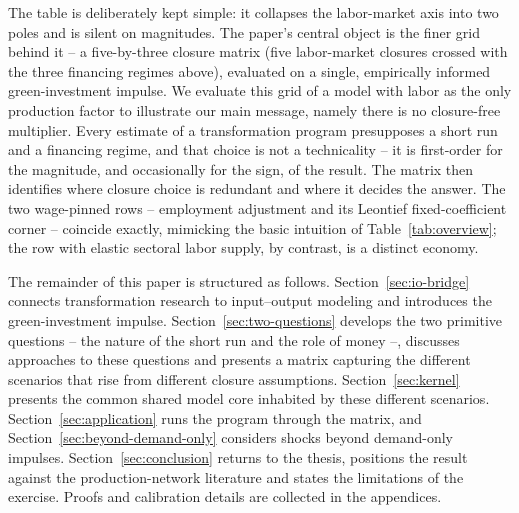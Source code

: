 

The table is deliberately kept simple: it collapses the labor-market axis into two poles and is silent on magnitudes. The paper's central object is the finer grid behind it -- a five-by-three closure matrix (five labor-market closures crossed with the three financing regimes above), evaluated on a single, empirically informed green-investment impulse. We evaluate this grid of a model with labor as the only production factor to illustrate our main message, namely there is no closure-free multiplier. Every estimate of a transformation program presupposes a short run and a financing regime, and that choice is not a technicality -- it is first-order for the magnitude, and occasionally for the sign, of the result. The matrix then identifies where closure choice is redundant and where it decides the answer. The two wage-pinned rows -- employment adjustment and its Leontief fixed-coefficient corner -- coincide exactly, mimicking the basic intuition of Table~\ref{tab:overview}; the row with elastic sectoral labor supply, by contrast, is a distinct economy.

The remainder of this paper is structured as follows. Section~\ref{sec:io-bridge} connects transformation research to input--output modeling and introduces the green-investment impulse. Section~\ref{sec:two-questions} develops the two primitive questions -- the nature of the short run and the role of money --, discusses approaches to these questions and presents a matrix capturing the different scenarios that rise from different closure assumptions. Section~\ref{sec:kernel} presents the common shared model core inhabited by these different scenarios. Section~\ref{sec:application} runs the program through the matrix, and Section~\ref{sec:beyond-demand-only} considers shocks beyond demand-only impulses. Section~\ref{sec:conclusion} returns to the thesis, positions the result against the production-network literature and states the limitations of the exercise. Proofs and calibration details are collected in the appendices.


